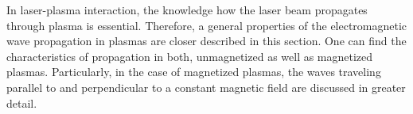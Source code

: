 In laser-plasma interaction, the knowledge how the laser beam propagates through plasma is essential. Therefore, a general properties of the electromagnetic wave propagation in plasmas are closer described in this section. One can find the characteristics of propagation in both, unmagnetized as well as magnetized plasmas. Particularly, in the case of magnetized plasmas, the waves traveling parallel to and perpendicular to a constant magnetic field are discussed in greater detail.